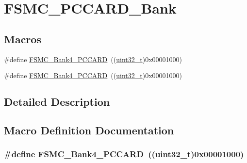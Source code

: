 \hypertarget{group___f_s_m_c___p_c_c_a_r_d___bank}{}\section{F\+S\+M\+C\+\_\+\+P\+C\+C\+A\+R\+D\+\_\+\+Bank}
\label{group___f_s_m_c___p_c_c_a_r_d___bank}
\subsection*{Macros}
\begin{DoxyCompactItemize}
\item 
\#define \hyperlink{group___f_s_m_c___p_c_c_a_r_d___bank_gad08ce7c7afc462f3d9ef085b05d42387}{F\+S\+M\+C\+\_\+\+Bank4\+\_\+\+P\+C\+C\+A\+RD}~((\hyperlink{_p_e___types_8h_a33594304e786b158f3fb30289278f5af}{uint32\+\_\+t})0x00001000)
\item 
\#define \hyperlink{group___f_s_m_c___p_c_c_a_r_d___bank_gad08ce7c7afc462f3d9ef085b05d42387}{F\+S\+M\+C\+\_\+\+Bank4\+\_\+\+P\+C\+C\+A\+RD}~((\hyperlink{_p_e___types_8h_a33594304e786b158f3fb30289278f5af}{uint32\+\_\+t})0x00001000)
\end{DoxyCompactItemize}


\subsection{Detailed Description}


\subsection{Macro Definition Documentation}
\subsubsection[{\texorpdfstring{F\+S\+M\+C\+\_\+\+Bank4\+\_\+\+P\+C\+C\+A\+RD}{FSMC_Bank4_PCCARD}}]{\setlength{\rightskip}{0pt plus 5cm}\#define F\+S\+M\+C\+\_\+\+Bank4\+\_\+\+P\+C\+C\+A\+RD~(({\bf uint32\+\_\+t})0x00001000)}\hypertarget{group___f_s_m_c___p_c_c_a_r_d___bank_gad08ce7c7afc462f3d9ef085b05d42387}{}\label{group___f_s_m_c___p_c_c_a_r_d___bank_gad08ce7c7afc462f3d9ef085b05d42387}


